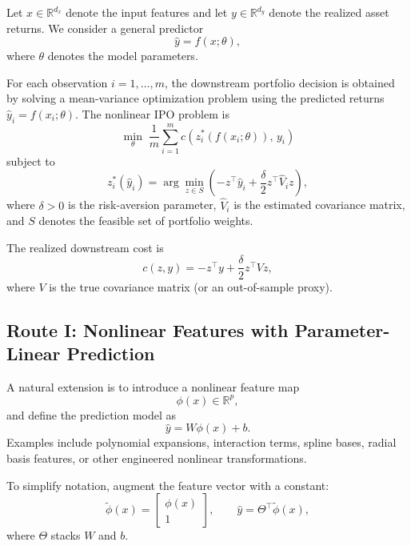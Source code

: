 \documentclass{article}
\begin{document}
Let $x \in \mathbb{R}^{d_x}$ denote the input features and let $y \in \mathbb{R}^{d_y}$ denote the realized asset returns. We consider a general predictor
\[
\hat y = f(x;\theta),
\]
where $\theta$ denotes the model parameters.

For each observation $i=1,\dots,m$, the downstream portfolio decision is obtained by solving a mean-variance optimization problem using the predicted returns $\hat y_i = f(x_i;\theta)$. The nonlinear IPO problem is
\begin{equation}
\min_{\theta} \; \frac{1}{m}\sum_{i=1}^{m} c\!\left(z_i^*(f(x_i;\theta)),\, y_i\right)
\label{eq:nonlinear_ipo_outer}
\end{equation}
subject to
\begin{equation}
z_i^*(\hat y_i)
=
\arg\min_{z \in S}
\left(
-z^\top \hat y_i
+ \frac{\delta}{2} z^\top \hat V_i z
\right),
\label{eq:nonlinear_ipo_inner}
\end{equation}
where $\delta > 0$ is the risk-aversion parameter, $\hat V_i$ is the estimated covariance matrix, and $S$ denotes the feasible set of portfolio weights.

The realized downstream cost is
\begin{equation}
c(z,y)
=
-z^\top y + \frac{\delta}{2} z^\top V z,
\label{eq:realized_cost}
\end{equation}
where $V$ is the true covariance matrix (or an out-of-sample proxy).

\subsection{Route I: Nonlinear Features with Parameter-Linear Prediction}

A natural extension is to introduce a nonlinear feature map
\[
\phi(x) \in \mathbb{R}^{p},
\]
and define the prediction model as
\begin{equation}
\hat y = W \phi(x) + b.
\label{eq:feature_model}
\end{equation}
Examples include polynomial expansions, interaction terms, spline bases, radial basis features, or other engineered nonlinear transformations.

To simplify notation, augment the feature vector with a constant:
\[
\tilde \phi(x)
=
\begin{bmatrix}
\phi(x) \\
1
\end{bmatrix},
\qquad
\hat y = \Theta^\top \tilde \phi(x),
\]
where $\Theta$ stacks $W$ and $b$.
\end{document}
